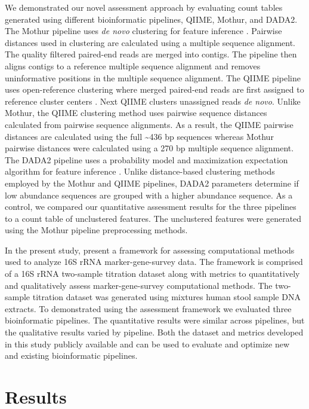 \documentclass[linenumbers]{bmcart}
\begin{document}

We demonstrated our novel assessment approach by evaluating count tables
generated using different bioinformatic pipelines, QIIME, Mothur, and
DADA2. The Mothur pipeline uses \emph{de novo} clustering for feature
inference \cite{westcott2017opticlust, schloss2009introducing}.
Pairwise distances used in clustering are calculated using a multiple
sequence alignment. The quality filtered paired-end reads are merged
into contigs. The pipeline then aligns contigs to a reference multiple
sequence alignment and removes uninformative positions in the multiple
sequence alignment. The QIIME pipeline uses open-reference clustering
where merged paired-end reads are first assigned to reference cluster
centers \cite{Rideout2014, Caporaso2010}. Next QIIME clusters
unassigned reads \emph{de novo}. Unlike Mothur, the QIIME clustering
method uses pairwise sequence distances calculated from pairwise
sequence alignments. As a result, the QIIME pairwise distances are
calculated using the full \textasciitilde{}436 bp sequences whereas
Mothur pairwise distances were calculated using a 270 bp multiple
sequence alignment. The DADA2 pipeline uses a probability model and
maximization expectation algorithm for feature inference
\cite{callahan2016dada2}. Unlike distance-based clustering methods
employed by the Mothur and QIIME pipelines, DADA2 parameters determine
if low abundance sequences are grouped with a higher abundance sequence.
As a control, we compared our quantitative assessment results for the
three pipelines to a count table of unclustered features. The
unclustered features were generated using the Mothur pipeline
preprocessing methods.

In the present study, present a framework for assessing computational methods used to analyze
16S rRNA marker-gene-survey data. The framework is comprised of a 16S rRNA two-sample titration dataset along with metrics to quantitatively and qualitatively assess marker-gene-survey computational methods.
The two-sample titration dataset was generated using mixtures human stool sample DNA extracts.
To demonstrated using the assessment framework we evaluated three bioinformatic pipelines.
The quantitative results were similar across pipelines, but the qualitative results varied by pipeline.
Both the dataset and metrics developed in this study publicly
available and can be used to evaluate and optimize new and existing bioinformatic pipelines.

\section*{Results}
\end{document}
